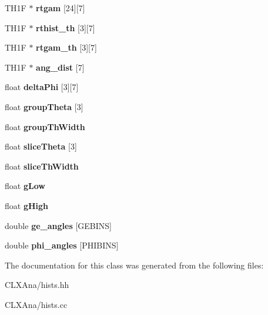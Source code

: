 \begin{DoxyCompactItemize}
\item 
\mbox{\label{classhists_adeb3604685e01f06ce37a345c9db012f}} 
T\+H1F $\ast$ {\bfseries rtgam} \mbox{[}24\mbox{]}\mbox{[}7\mbox{]}
\item 
\mbox{\label{classhists_adfc5bcc585a5171f19dbb7e8284b22d4}} 
T\+H1F $\ast$ {\bfseries rthist\+\_\+th} \mbox{[}3\mbox{]}\mbox{[}7\mbox{]}
\item 
\mbox{\label{classhists_ada3a83cc40c9e6f0cd3c660280323474}} 
T\+H1F $\ast$ {\bfseries rtgam\+\_\+th} \mbox{[}3\mbox{]}\mbox{[}7\mbox{]}
\item 
\mbox{\label{classhists_a7d2221efce8d535dc591c7bfb4f04f2c}} 
T\+H1F $\ast$ {\bfseries ang\+\_\+dist} \mbox{[}7\mbox{]}
\item 
\mbox{\label{classhists_a22c4de499622cc1dec36ec29b41c8713}} 
float {\bfseries delta\+Phi} \mbox{[}3\mbox{]}\mbox{[}7\mbox{]}
\item 
\mbox{\label{classhists_a7033b46f4a94aeabf718fdc9e86aad8f}} 
float {\bfseries group\+Theta} \mbox{[}3\mbox{]}
\item 
\mbox{\label{classhists_ace26a014c051d660889932ec53d1cd3a}} 
float {\bfseries group\+Th\+Width}
\item 
\mbox{\label{classhists_ad83d0b168c8cbe2a91e5c594dc21c718}} 
float {\bfseries slice\+Theta} \mbox{[}3\mbox{]}
\item 
\mbox{\label{classhists_ac447eab5907a18497b603b04bbbdee85}} 
float {\bfseries slice\+Th\+Width}
\item 
\mbox{\label{classhists_a5ec0fa70a759c0f75086585bfa9b7325}} 
float {\bfseries g\+Low}
\item 
\mbox{\label{classhists_aa13d400ee0f56ad1037867380a95c0ac}} 
float {\bfseries g\+High}
\item 
\mbox{\label{classhists_a2e5cc24dac3794d5186e30366004fcbc}} 
double {\bfseries ge\+\_\+angles} \mbox{[}G\+E\+B\+I\+NS\mbox{]}
\item 
\mbox{\label{classhists_a639b52545a8bfc7b248a33f5660f8082}} 
double {\bfseries phi\+\_\+angles} \mbox{[}P\+H\+I\+B\+I\+NS\mbox{]}
\end{DoxyCompactItemize}


The documentation for this class was generated from the following files\+:\begin{DoxyCompactItemize}
\item 
C\+L\+X\+Ana/hists.\+hh\item 
C\+L\+X\+Ana/hists.\+cc\end{DoxyCompactItemize}
